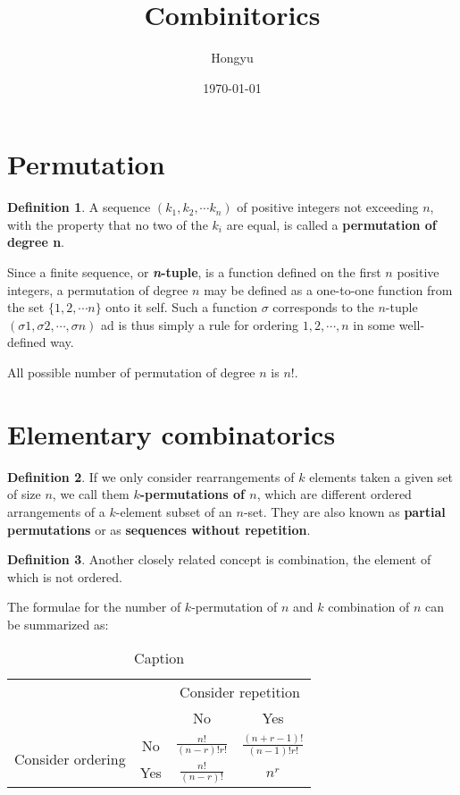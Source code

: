 \documentclass{book}
\title{Combinitorics}
\author{Hongyu}
\date{\today}
\theoremstyle{remark}
\theoremstyle{definition}
\newtheorem{definition}{Definition}[section]
\begin{document}
\section{Permutation}
\begin{definition}
A sequence $(k_1, k_2, \cdots k_n)$ of positive integers not exceeding $n$, with the property that no two of the $k_i$ are equal, is called a \textbf{permutation of degree n}. 

Since a finite sequence, or \textbf{\textit{n}-tuple}, is a function defined on the first $n$ positive integers, a permutation of degree $n$ may be defined as a one-to-one function from the set $\{1, 2, \cdots n \}$ onto it self. Such a function $\sigma$ corresponds to the $n$-tuple $(\sigma 1, \sigma 2, \cdots, \sigma n )$ ad is thus simply a rule for ordering $1, 2, \cdots, n$ in some well-defined way. 
\end{definition}

All possible number of permutation of degree $n$ is $n!$.

\section{Elementary combinatorics}

\begin{definition}
If we only consider rearrangements of $k$ elements taken a given set of size $n$, we call them \textbf{$k$-permutations of $n$}, which are different ordered arrangements of a $k$-element subset of an $n$-set. They are also known as \textbf{partial permutations} or as \textbf{sequences without repetition}.
\end{definition}

\begin{definition}
Another closely related concept is combination, the element of which is not ordered. 
\end{definition}

The formulae for the number of $k$-permutation of $n$ and $k$ combination of $n$ can be summarized as: 
\begin{table}[h!]
    \centering
    \begin{tabular}{|c|c|c|c|}
        \hline
         {} & {} & \multicolumn{2}{|c|}{Consider repetition} \\\cline{3-4}
         {} & {} & No & Yes \\\hline
         \multirow{2}{*}{Consider ordering} & No & $\frac{n!}{(n - r)!r!}$ & $\frac{(n + r - 1)!}{(n-1)!r!}$\\\cline{2-4}
         & Yes & $\frac{n!}{(n - r)!}$ & $n^r$\\\hline
         
    \end{tabular}
    \caption{Caption}
    \label{tab:my_label}
\end{table}
\end{document}
